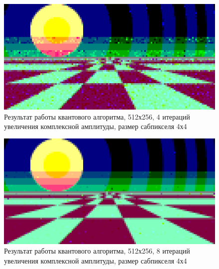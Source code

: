 \begin{figure}[H]
	\begin{center}
		\includegraphics[scale=0.96]{img/prog_res/qss-512-4.png}
	\end{center}
	\captionsetup{justification=centering}
	\caption{Результат работы квантового алгоритма, 512х256, 4 итераций увеличения комплексной амплитуды, размер сабпикселя 4х4}
	\label{img:example_01}
\end{figure}

\begin{figure}[H]
	\begin{center}
		\includegraphics[scale=0.96]{img/prog_res/qss-512-8.png}
	\end{center}
	\captionsetup{justification=centering}
	\caption{Результат работы квантового алгоритма, 512х256, 8 итераций увеличения комплексной амплитуды, размер сабпикселя 4х4}
	\label{img:example_02}
\end{figure}

